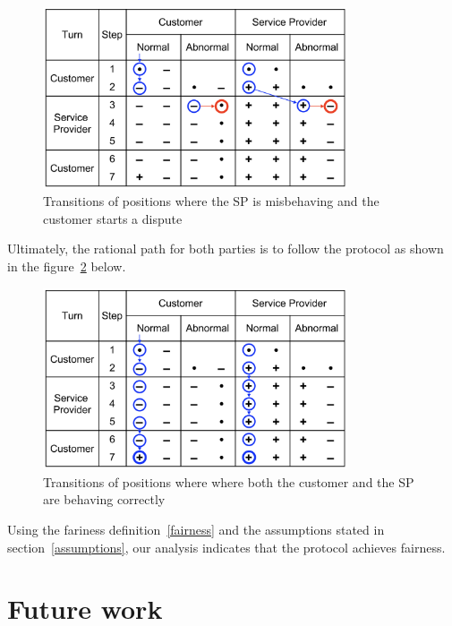 \documentclass{ieeeaccess}
\begin{document}
\begin{figure}[h!]
\includegraphics[width=9cm]{formal-misbehaviour-path.png}
\centering
\caption{Transitions of positions where the SP is misbehaving and the customer starts a dispute}
\label{fig:misbehaviour}
\end{figure}

Ultimately, the rational path for both parties is to follow the protocol as shown in the figure~\ref{fig:rational} below.

\begin{figure}[h!]
\includegraphics[width=9cm]{formal-rational-path.png}
\centering
\caption{Transitions of positions where where both the customer and the SP are behaving correctly}
\label{fig:rational}
\end{figure}


Using the fariness definition~\ref{fairness} and the assumptions stated in section~\ref{assumptions}, our analysis indicates that the protocol achieves fairness.


\section{Future work}
\label{sec:future-work}
\end{document}
